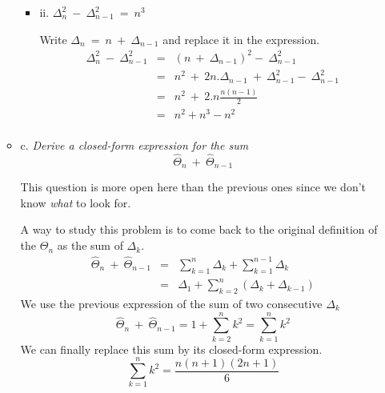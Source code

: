 \begin{itemize}
\begin{itemize}
\begin{itemize}
 \item ii.
$\Delta_n^2 \ - \ \Delta_{n-1}^2 \ = \ n^3$

\smallskip

Write $\Delta_n \ = \ n \ + \ \Delta_{n-1}$ and replace it in the expression.
\begin{eqnarray*}
\Delta_n^2 \ - \ \Delta_{n-1}^2 & = & \left( n \ + \ \Delta_{n-1} \right)^2 - \ \Delta_{n-1}^2  \\
 & = & n^2 \ + \ 2n.\Delta_{n-1} \ + \ \Delta_{n-1}^2 - \ \Delta_{n-1}^2 \\
 & = & n^2 \ + \ 2.n\frac{n(n-1)}{2}\\
 & = & n^2 + n^3 - n^2 \\
\end{eqnarray*} 

\end{itemize}

  \item c.
{\em Derive a closed-form expression for the sum}
\[ \widehat{\Theta}_n \ + \ \widehat{\Theta} _{n-1} \]

This question is more open here than the previous ones since we don't know \textit{what} to look for.
\smallskip

A way to study this problem is to come back to the original definition of the $\Theta_n$
as the sum of $\Delta_k$.
\begin{eqnarray*}
\widehat{\Theta}_n \ + \ \widehat{\Theta} _{n-1}  & = & \sum_{k=1}^n \Delta_k + \sum_{k=1}^{n-1} \Delta_k \\
 & = & \Delta_1 + \sum_{k=2}^{n} \left( \Delta_k + \Delta_{k-1} \right)
\end{eqnarray*} 
We use the previous expression of the sum of two consecutive $\Delta_k$
\[
\widehat{\Theta}_n \ + \ \widehat{\Theta} _{n-1} = 1 + \sum_{k=2}^{n} k^2  = \sum_{k=1}^{n} k^2 
\]
We can finally replace this sum by its closed-form expression.
\[
\sum_{k=1}^{n} k^2 = \frac{n(n+1)(2n+1)}{6}
\]

\end{itemize}
\end{itemize} 


